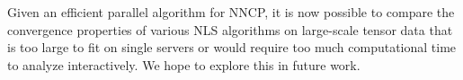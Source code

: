 Given an efficient parallel algorithm for NNCP, it is now possible to compare the convergence properties of various NLS algorithms on large-scale tensor data that is too large to fit on single servers or would require too much computational time to analyze interactively.
We hope to explore this in future work.